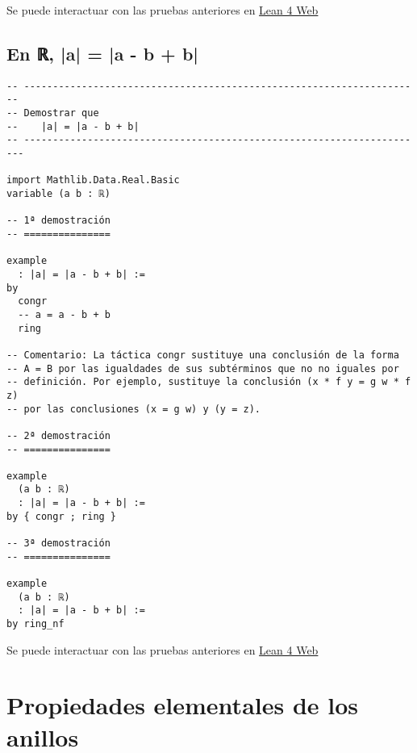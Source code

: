 Se puede interactuar con las pruebas anteriores en \href{https://lean.math.hhu.de/\#url=https://raw.githubusercontent.com/jaalonso/Calculemus2/main/src/Cuadrado\_igual\_a\_cuadrado.lean}{Lean 4 Web}

\section{En ℝ, |a| = |a - b + b|}
\label{sec:org4f2f527}
\begin{verbatim}
-- ---------------------------------------------------------------------
-- Demostrar que
--    |a| = |a - b + b|
-- ----------------------------------------------------------------------

import Mathlib.Data.Real.Basic
variable (a b : ℝ)

-- 1ª demostración
-- ===============

example
  : |a| = |a - b + b| :=
by
  congr
  -- a = a - b + b
  ring

-- Comentario: La táctica congr sustituye una conclusión de la forma
-- A = B por las igualdades de sus subtérminos que no no iguales por
-- definición. Por ejemplo, sustituye la conclusión (x * f y = g w * f z)
-- por las conclusiones (x = g w) y (y = z).

-- 2ª demostración
-- ===============

example
  (a b : ℝ)
  : |a| = |a - b + b| :=
by { congr ; ring }

-- 3ª demostración
-- ===============

example
  (a b : ℝ)
  : |a| = |a - b + b| :=
by ring_nf
\end{verbatim}
Se puede interactuar con las pruebas anteriores en \href{https://lean.math.hhu.de/\#url=https://raw.githubusercontent.com/jaalonso/Calculemus2/main/src/Demostracion\_por\_congruencia.lean}{Lean 4 Web}

\chapter{Propiedades elementales de los anillos}
\label{sec:orgc55cd7f}

